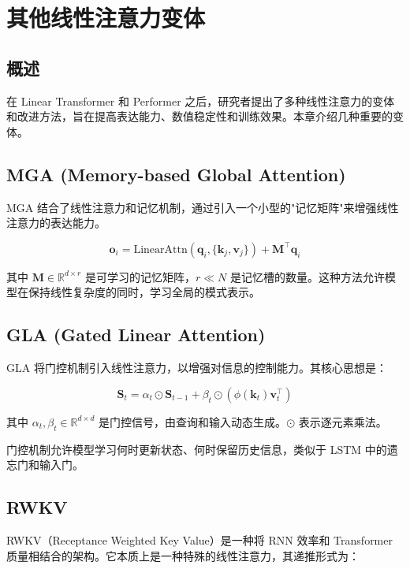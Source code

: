\chapter{其他线性注意力变体}

\section{概述}

在 Linear Transformer 和 Performer 之后，研究者提出了多种线性注意力的变体和改进方法，旨在提高表达能力、数值稳定性和训练效果。本章介绍几种重要的变体。

\section{MGA (Memory-based Global Attention)}

MGA 结合了线性注意力和记忆机制，通过引入一个小型的"记忆矩阵"来增强线性注意力的表达能力。

\begin{equation}
    \mathbf{o}_i = \text{LinearAttn}(\mathbf{q}_i, \{\mathbf{k}_j, \mathbf{v}_j\}) + \mathbf{M}^\top \mathbf{q}_i
\end{equation}

其中 $\mathbf{M} \in \mathbb{R}^{d \times r}$ 是可学习的记忆矩阵，$r \ll N$ 是记忆槽的数量。这种方法允许模型在保持线性复杂度的同时，学习全局的模式表示。

\section{GLA (Gated Linear Attention)}

GLA 将门控机制引入线性注意力，以增强对信息的控制能力。其核心思想是：

\begin{equation}
    \mathbf{S}_t = \alpha_t \odot \mathbf{S}_{t-1} + \beta_t \odot (\phi(\mathbf{k}_t)\mathbf{v}_t^\top)
\end{equation}

其中 $\alpha_t, \beta_t \in \mathbb{R}^{d \times d}$ 是门控信号，由查询和输入动态生成。$\odot$ 表示逐元素乘法。

门控机制允许模型学习何时更新状态、何时保留历史信息，类似于 LSTM 中的遗忘门和输入门。

\section{RWKV}

RWKV（Receptance Weighted Key Value）是一种将 RNN 效率和 Transformer 质量相结合的架构。它本质上是一种特殊的线性注意力，其递推形式为：

